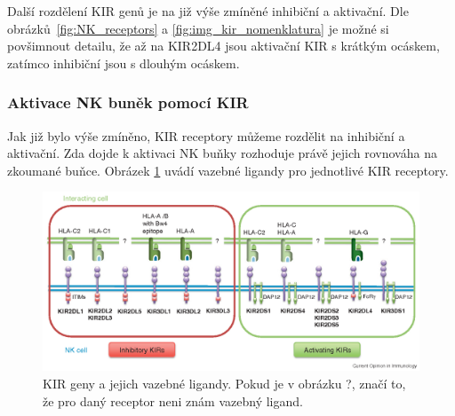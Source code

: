 \documentclass[czech,DP]{thesiskiv}
\numberwithin{equation}{section}
\begin{document}
\noindent
Další rozdělení KIR genů je na již výše zmíněné inhibiční a aktivační. Dle obrázků~\ref{fig:NK_receptors} a  \ref{fig:img_kir_nomenklatura} je možné si povšimnout detailu, že až na KIR2DL4 jsou aktivační KIR s krátkým ocáskem, zatímco inhibiční jsou s dlouhým ocáskem. 

\subsubsection{Aktivace NK buněk pomocí KIR}
Jak již bylo výše zmíněno, KIR receptory můžeme rozdělit na inhibiční a aktivační. Zda dojde k aktivaci NK buňky rozhoduje právě jejich rovnováha na zkoumané buňce. Obrázek \ref{fig:img_kir_ligand} uvádí vazebné ligandy pro jednotlivé KIR receptory.  

\begin{figure}[H]		
		\centering
		\includegraphics[width=\textwidth]{./img/KIR_nomenklatura2.png}
		\caption{KIR geny a jejich vazebné ligandy. Pokud je v obrázku ?, značí to, že pro daný receptor neni znám vazebný ligand. \cite{KIR_img_nomenklatura}}
		\label{fig:img_kir_ligand}
\end{figure}
\end{document}
